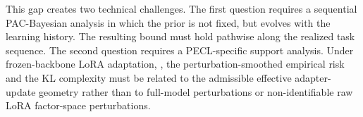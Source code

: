 \documentclass{article}
\begin{document}
This gap creates two technical challenges.
The first question requires a sequential PAC-Bayesian analysis in which the prior is not fixed, but evolves with the learning history. 
The resulting bound must hold pathwise along the realized task sequence. 
The second question requires a PECL-specific support analysis. 
Under frozen-backbone LoRA adaptation, , the perturbation-smoothed empirical risk and the KL complexity must be related to the admissible effective adapter-update geometry rather than to  full-model perturbations or non-identifiable raw LoRA factor-space perturbations.

\end{document}

